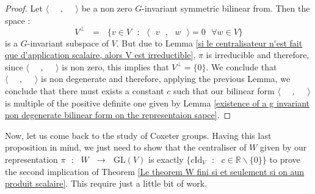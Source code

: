 \documentclass[envcountsame,envcountchap]{svmono}
\newcommand{\R}{\mathbb R}
\newcommand{\prods}[2]{\langle\qq #1\qq,\qq#2\qq\rangle}
\newcommand{\qq}{\text{ }}
\newcommand{\fctt}[2]{\qq:\qq#1\qq\rightarrow\qq#2}
\begin{document}
\begin{proof}
	Let $\prods{}{}$ be a non zero $G$-invariant symmetric bilinear from. Then the space :
	\begin{equation}
	V^\perp\qq=\qq \{v\in V\qq :\qq \prods{v}{w}=0\qq\forall w\in V\}
	\end{equation}
	is a $G$-invariant subspace of $V$. But due to Lemma \ref{si le centralisateur n'est fait que d'application scalaire, alors V est irreductible}, $\pi$ is irreducible and therefore, since $\prods{}{}$ is non zero, this implies that $V^\perp=\{0\}$. We conclude that $\prods{}{}$ is non degenerate and therefore, applying the previous Lemma, we conclude that there must exists a constant $c$ such that our bilinear form $\prods{}{}$ is multiple of the positive definite one given by Lemma \ref{existence of a g invariant non degenerate bilinear form on the representaion sapce}.
\end{proof}

Now, let us come back to the study of Coxeter groups.
Having this last proposition in mind, we just need to show that the centraliser of $W$ given by our representation $\pi \fctt{W}{\mbox{GL}(V)}$ is exactly $\{c\mbox{Id}_V\qq:\qq c\in \R\backslash\{0\}\}$ to prove the second implication of Theorem \ref{Le theorem W fini si et seulement si on  aun produit scalaire}. This require just a little bit of work.
\end{document}
